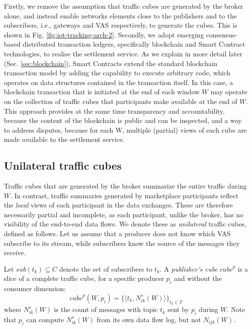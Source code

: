 \documentclass[chi_draft]{sigchi}
\begin{document}
Firstly, we remove the assumption that traffic cubes are generated by the broker alone, and instead enable networks elements close to the publishers and to the subscribers, i.e., gateways and VAS respectively, to generate the cubes. This is shown in Fig. \ref{fig:iot-tracking-arch-2}.
%
Secondly, we adopt emerging consensus-based distributed transaction ledgers, specifically blockchain and Smart Contract technologies, to realise the settlement service.
As we explain in more detail later (Sec. \ref{sec:blockchain}), Smart Contracts extend the standard blockchain transaction model by adding the capability to execute arbitrary code, which operates on data structures contained in the transaction itself. 
In this case, a blockchain transaction that is initiated at the end of each window $W$ may operate on the collection of traffic cubes that participants make available at the end of $W$.
This  approach provides at the same time transparency and accountability, because the content of the blockchain is public and can be inspected, and a way to address disputes, because for each W, multiple (partial) views of each cube are made available to the settlement service.

\subsection{Unilateral traffic cubes} \label{sec:u-cubes}
Traffic cubes that are generated by the broker summarize the entire traffic during $W$.
In contrast, traffic summaries generated by marketplace participants reflect the \textit{local} views of each participant in the data exchanges.
These are therefore necessarily partial and incomplete, as each participant, unlike the broker, has no visibility of the end-to-end data flows. 
We denote these as \textit{unilateral} traffic cubes, defined as follows.
Let us assume that a producer does not know which VAS subscribe to its stream, while subscribers know the source of the messages they receive. 

Let $\mathit{sub}(t_k) \subseteq C $ denote the set of subscribers to $t_k$.
%
A \textit{publisher's cube} $\mathit{cube}^p$ is a slice of a complete traffic cube, for a specific producer $p_i$ and without the consumer dimension:
\[
\mathit{cube}^p(W, p_i)  =  \{ \langle t_k,  N^s_{ik}(W) \rangle \}_{t_k \in T}
\]
where $N^s_{ik}(W)$ is the count of messages with topic $t_k$ sent by $p_i$ during $W$.
Note that $ p_i $ can compute $ N^s_{ik}(W)  $ from its own data flow log, but not $ N_{ijk}(W)  $.
\end{document}
